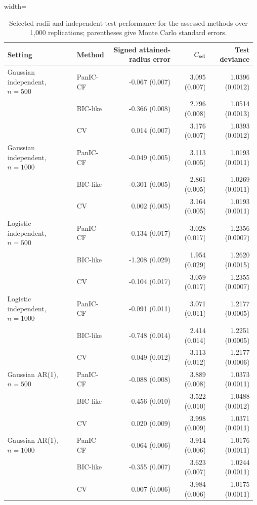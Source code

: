 \documentclass[12pt]{article}
\newenvironment{bluechange}{\begingroup\color[rgb]{0.00,0.00,1.00}}{\endgroup}
\theoremstyle{remark}
\theoremstyle{plain}
\begin{document}
\begin{bluechange}
\begin{table}[H]
\centering
\caption{Selected radii and independent-test performance for the assessed methods over 1,000 replications; parentheses give Monte Carlo standard errors.}
\label{Table: revised primary performance}
\begin{adjustbox}{width=\textwidth}
\scriptsize
\begin{tabular}{llrrr}
\hline
Setting & Method & Signed attained-radius error & $C_{\rm sel}$ & Test deviance \\
\hline
Gaussian independent, $n=500$ & PanIC-CF & -0.067 (0.007) & 3.095 (0.007) & 1.0396 (0.0012) \\
 & BIC-like & -0.366 (0.008) & 2.796 (0.008) & 1.0514 (0.0013) \\
 & CV & 0.014 (0.007) & 3.176 (0.007) & 1.0393 (0.0012) \\
Gaussian independent, $n=1000$ & PanIC-CF & -0.049 (0.005) & 3.113 (0.005) & 1.0193 (0.0011) \\
 & BIC-like & -0.301 (0.005) & 2.861 (0.005) & 1.0269 (0.0011) \\
 & CV & 0.002 (0.005) & 3.164 (0.005) & 1.0193 (0.0011) \\
Logistic independent, $n=500$ & PanIC-CF & -0.134 (0.017) & 3.028 (0.017) & 1.2356 (0.0007) \\
 & BIC-like & -1.208 (0.029) & 1.954 (0.029) & 1.2620 (0.0015) \\
 & CV & -0.104 (0.017) & 3.059 (0.017) & 1.2355 (0.0007) \\
Logistic independent, $n=1000$ & PanIC-CF & -0.091 (0.011) & 3.071 (0.011) & 1.2177 (0.0005) \\
 & BIC-like & -0.748 (0.014) & 2.414 (0.014) & 1.2251 (0.0005) \\
 & CV & -0.049 (0.012) & 3.113 (0.012) & 1.2177 (0.0006) \\
Gaussian AR(1), $n=500$ & PanIC-CF & -0.088 (0.008) & 3.889 (0.008) & 1.0373 (0.0011) \\
 & BIC-like & -0.456 (0.010) & 3.522 (0.010) & 1.0488 (0.0012) \\
 & CV & 0.020 (0.009) & 3.998 (0.009) & 1.0371 (0.0011) \\
Gaussian AR(1), $n=1000$ & PanIC-CF & -0.064 (0.006) & 3.914 (0.006) & 1.0176 (0.0011) \\
 & BIC-like & -0.355 (0.007) & 3.623 (0.007) & 1.0244 (0.0011) \\
 & CV & 0.007 (0.006) & 3.984 (0.006) & 1.0175 (0.0011) \\

\end{tabular}
\end{adjustbox}
\end{table}
\end{bluechange}
\end{document}
